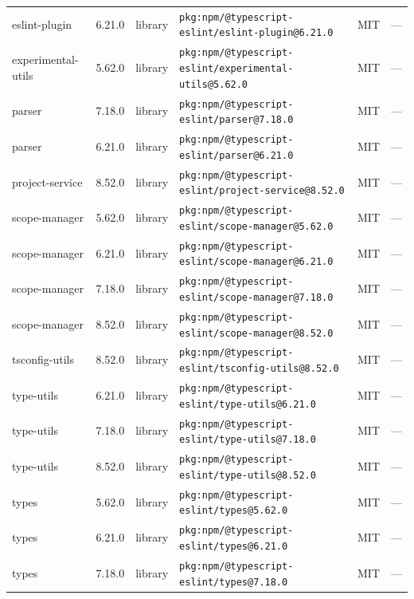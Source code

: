\documentclass[11pt,a4paper]{article}
\begin{document}
\begin{longtable}{|p{4cm}|p{2cm}|p{1.6cm}|p{5cm}|p{1.5cm}|p{3.5cm}|}
\raggedright eslint-plugin & 6.21.0 & library & \small\texttt{pkg:npm/@typescript-eslint/eslint-plugin@6.21.0} & MIT & \small — \\
\raggedright experimental-utils & 5.62.0 & library & \small\texttt{pkg:npm/@typescript-eslint/experimental-utils@5.62.0} & MIT & \small — \\
\raggedright parser & 7.18.0 & library & \small\texttt{pkg:npm/@typescript-eslint/parser@7.18.0} & MIT & \small — \\
\raggedright parser & 6.21.0 & library & \small\texttt{pkg:npm/@typescript-eslint/parser@6.21.0} & MIT & \small — \\
\raggedright project-service & 8.52.0 & library & \small\texttt{pkg:npm/@typescript-eslint/project-service@8.52.0} & MIT & \small — \\
\raggedright scope-manager & 5.62.0 & library & \small\texttt{pkg:npm/@typescript-eslint/scope-manager@5.62.0} & MIT & \small — \\
\raggedright scope-manager & 6.21.0 & library & \small\texttt{pkg:npm/@typescript-eslint/scope-manager@6.21.0} & MIT & \small — \\
\raggedright scope-manager & 7.18.0 & library & \small\texttt{pkg:npm/@typescript-eslint/scope-manager@7.18.0} & MIT & \small — \\
\raggedright scope-manager & 8.52.0 & library & \small\texttt{pkg:npm/@typescript-eslint/scope-manager@8.52.0} & MIT & \small — \\
\raggedright tsconfig-utils & 8.52.0 & library & \small\texttt{pkg:npm/@typescript-eslint/tsconfig-utils@8.52.0} & MIT & \small — \\
\raggedright type-utils & 6.21.0 & library & \small\texttt{pkg:npm/@typescript-eslint/type-utils@6.21.0} & MIT & \small — \\
\raggedright type-utils & 7.18.0 & library & \small\texttt{pkg:npm/@typescript-eslint/type-utils@7.18.0} & MIT & \small — \\
\raggedright type-utils & 8.52.0 & library & \small\texttt{pkg:npm/@typescript-eslint/type-utils@8.52.0} & MIT & \small — \\
\raggedright types & 5.62.0 & library & \small\texttt{pkg:npm/@typescript-eslint/types@5.62.0} & MIT & \small — \\
\raggedright types & 6.21.0 & library & \small\texttt{pkg:npm/@typescript-eslint/types@6.21.0} & MIT & \small — \\
\raggedright types & 7.18.0 & library & \small\texttt{pkg:npm/@typescript-eslint/types@7.18.0} & MIT & \small — \\

\end{longtable}
\end{document}
